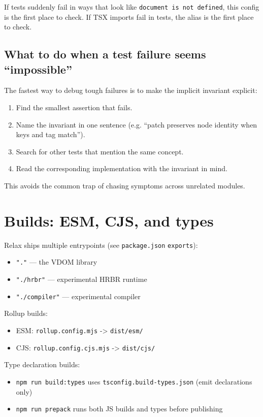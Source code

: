 If tests suddenly fail in ways that look like \texttt{document is not defined}, this config is the first place to check.
If TSX imports fail in tests, the alias is the first place to check.

\subsection{What to do when a test failure seems ``impossible''}

The fastest way to debug tough failures is to make the implicit invariant explicit:

\begin{enumerate}
\item Find the smallest assertion that fails.
\item Name the invariant in one sentence (e.g. ``patch preserves node identity when keys and tag match'').
\item Search for other tests that mention the same concept.
\item Read the corresponding implementation with the invariant in mind.
\end{enumerate}

This avoids the common trap of chasing symptoms across unrelated modules.

\section{Builds: ESM, CJS, and types}

Relax ships multiple entrypoints (see \texttt{package.json} \texttt{exports}):

\begin{itemize}
\item \texttt{"."} --- the VDOM library
\item \texttt{"./hrbr"} --- experimental HRBR runtime
\item \texttt{"./compiler"} --- experimental compiler
\end{itemize}

Rollup builds:

\begin{itemize}
\item ESM: \texttt{rollup.config.mjs} -> \texttt{dist/esm/}
\item CJS: \texttt{rollup.config.cjs.mjs} -> \texttt{dist/cjs/}
\end{itemize}

Type declaration builds:

\begin{itemize}
\item \texttt{npm run build:types} uses \texttt{tsconfig.build-types.json} (emit declarations only)
\item \texttt{npm run prepack} runs both JS builds and types before publishing
\end{itemize}

